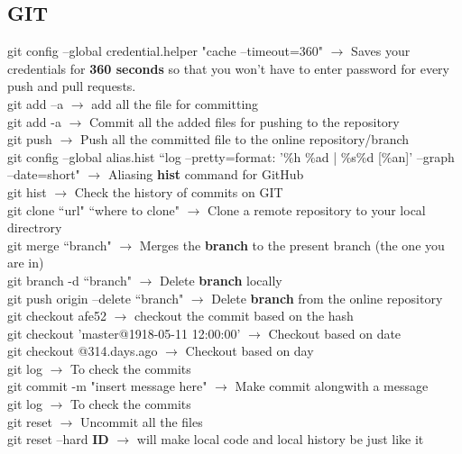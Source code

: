 \documentclass[twoside,a4paper]{article}
\newcommand{\tcb}{\color{blue}}
\newcommand{\tcc}{\color{cyan}}
\newcommand{\tcr}{\color{red}}
\newcommand{\tck}{\color{black}}
\newcommand{\ra }{$\rightarrow$ }
\newcommand{\hs}{\hspace}
\begin{document}
\begin{multicols}{2}
\tcc \section{GIT}

	\hs{-0.8 cm} \tcr  git config --global credential.helper
	 "cache --timeout=360" \tck \ra Saves your credentials
	 for \textbf{360 seconds} so that you won't have to enter password for
	 every push and pull requests.\\
	\tcr git add --a \tck \ra add all the
	 file for committing\\
	\tcr git add -a \tck \ra Commit all the added
	 files for pushing to the repository \\
	\tcr git push \tck \ra Push all the committed 
	 file to the online repository/branch \\
	\tcr git \tcb config --global alias.hist 
	``log --pretty=format: '\%h \%ad | \%s\%d [\%an]' --graph --date=short"
	\tck \ra Aliasing \textbf{hist} command for GitHub\\
	\tcr git hist \tck \ra Check the history of
	commits on GIT\\
	\tcr git clone \tcb ``url" ``where to clone" 
	\tck  \ra Clone a remote repository to your local 
	directrory\\
	\tcr git merge \tcb ``branch" \tck $\rightarrow$
	Merges the \textbf{branch} to the present branch (the one you are in)\\
	\tcr git branch \tcb -d ``branch" \tck 
	\ra Delete \textbf{branch} locally\\
	\tcr git push \tcb origin --delete ``branch" \tck 
	\ra Delete \textbf{branch} from the online repository\\
	\tcr git checkout \tcb afe52 \tck \ra 
	checkout the commit based on the hash\\
	\tcr git checkout \tcb 'master@{1918-05-11 12:00:00}' 
	\tck \ra Checkout based on date\\
	\tcr git checkout \tcb @{314.days.ago}
	\tck \ra Checkout based on day\\
	\tcr git log \tck \ra To check the commits\\
	\tcr git commit \tcb -m "insert message here"\tck 
	\ra Make commit alongwith a message\\
	\tcr git log \tck \ra To check the commits\\
	\tcr git reset \tck \ra Uncommit all the files\\
	\tcr git reset \tcb --hard \textbf{ID} \tck 
	\ra will make local code and local history be just like it

\end{multicols}
\end{document}
